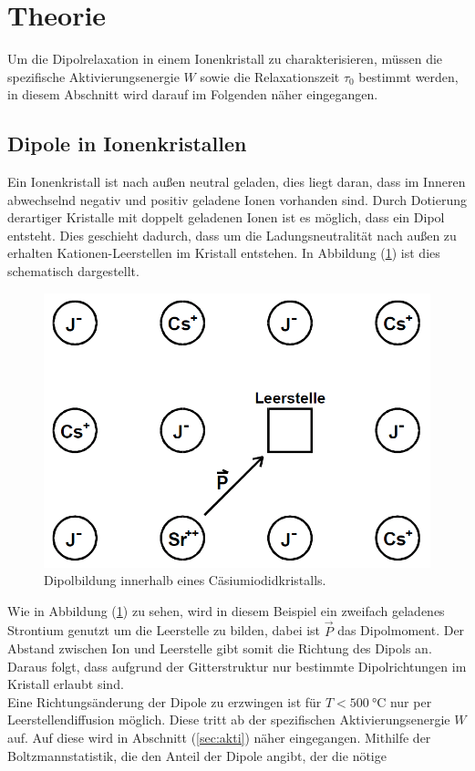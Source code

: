 \section{Theorie}
\label{sec:Theorie}
Um die Dipolrelaxation in einem Ionenkristall zu charakterisieren, müssen die spezifische Aktivierungsenergie $W$ sowie die Relaxationszeit $\tau_\mathrm{0}$ bestimmt werden, in diesem Abschnitt wird darauf im Folgenden näher
eingegangen.
\subsection{Dipole in Ionenkristallen}
\label{sec:11}
Ein Ionenkristall ist nach außen neutral geladen, dies liegt daran, dass im Inneren abwechselnd negativ und positiv geladene Ionen vorhanden sind. Durch Dotierung derartiger Kristalle mit doppelt geladenen Ionen ist es möglich, dass ein
Dipol entsteht. Dies geschieht dadurch, dass um die Ladungsneutralität nach außen zu erhalten Kationen-Leerstellen im Kristall entstehen. In Abbildung (\ref{fig:doti}) ist dies schematisch dargestellt.
\begin{figure}[h!]
  \centering
  \includegraphics[scale=0.5]{fig/Dipol.png}
  \caption{Dipolbildung innerhalb eines Cäsiumiodidkristalls.}
  \label{fig:doti}
\end{figure}
Wie in Abbildung (\ref{fig:doti}) zu sehen, wird in diesem Beispiel ein zweifach geladenes Strontium genutzt um die Leerstelle zu bilden, dabei ist $\vec{P}$ das Dipolmoment. Der Abstand zwischen Ion und Leerstelle gibt somit
die Richtung des Dipols an. Daraus folgt, dass aufgrund der Gitterstruktur nur bestimmte Dipolrichtungen im Kristall erlaubt sind. \\ Eine Richtungsänderung der Dipole zu erzwingen ist für $T<\SI{500}{\degreeCelsius}$ nur per Leerstellendiffusion möglich. Diese tritt ab der spezifischen Aktivierungsenergie $W$ auf. Auf diese wird in Abschnitt (\ref{sec:akti}) näher eingegangen. Mithilfe der Boltzmannstatistik, die den Anteil der Dipole angibt, der die nötige
